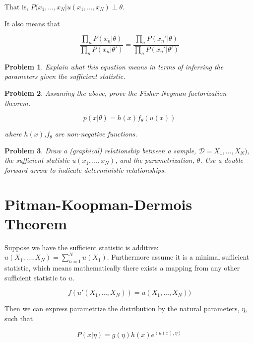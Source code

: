 \documentclass[a4paper]{article}
\newtheorem{problem}{Problem}[section]
\begin{document}
That is, $P( x_1, \ldots, x_N \vert u(x_1, \ldots, x_N) \perp \theta $.

It also means that 

\begin{equation}
  \frac{\prod_n P(x_n \vert \theta) }{ \prod_n P( x_n \vert \theta') } = \frac{\prod_n P( x_n' \vert \theta) }{ \prod_n P( x_n' \vert \theta') }
  \label{}
\end{equation}

\begin{problem}
Explain what this equation means in terms of inferring the parameters given the sufficient statistic.
\end{problem}

\begin{problem}
Assuming the above, prove the Fisher-Neyman factorization theorem.

\begin{equation}
  p(x \vert \theta) = h(x) f_\theta( u(x) )
  \label{Fisher-Neyman factorization theorem}
\end{equation}

where $h(x)$,$f_\theta$ are non-negative functions.
\end{problem}

\begin{problem}
Draw a (graphical) relationship between a sample, $\mathcal{D} = X_1,\ldots,X_N)$, the sufficient statistic $u(x_1, \ldots, x_N)$, and the parametrization, $\theta$. 
Use a double forward arrow to indicate deterministic relationships.
\end{problem}

\section{Pitman-Koopman-Dermois Theorem}

Suppose we have the sufficient statistic is additive: $ u(X_1,\ldots,X_N) = \sum_{n=1}^N u(X_1) $.  Furthermore assume it is a minimal sufficient statistic, which means mathematically there exists a mapping from any other sufficient statistic to $u$.

\begin{equation}
  f( u'(X_1,\ldots,X_N) ) = u(X_1,\ldots,X_N) )
  \label{}
\end{equation}

Then we can express parametrize the distribution by the natural parameters, $\eta$, such that

\begin{equation}
  P( x \vert \eta) = g(\eta) h(x) e^{ \left< u(x), \eta \right>}
  \label{}
\end{equation}
\end{document}
